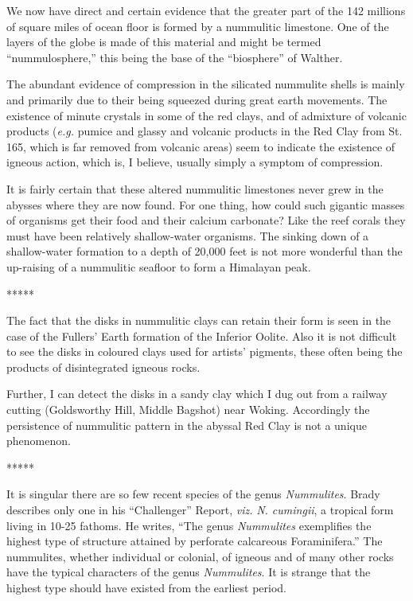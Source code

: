 \documentclass[a4paper, 12pt, oneside]{article}
\begin{document}
We now have direct and certain evidence that the greater part of the 142 millions of square miles of ocean floor is formed by a nummulitic limestone. One of the layers of the globe is made of this material and might be termed ``nummulosphere,'' this being the base of the ``biosphere'' of Walther.

The abundant evidence of compression in the silicated nummulite shells is mainly and primarily due to their being squeezed during great earth movements. The existence of minute crystals in some of the red clays, and of admixture of volcanic products (\emph{e.g.} pumice and glassy and volcanic products in the Red Clay from St. 165, which is far removed from volcanic areas) seem to indicate the existence of igneous action, which is, I believe, usually simply a symptom of compression.

It is fairly certain that these altered nummulitic limestones never grew in the abysses where they are now found. For one thing, how could such gigantic masses of organisms get their food and their calcium carbonate? Like the reef corals they must have been relatively shallow-water organisms. The sinking down of a shallow-water formation to a depth of 20,000 feet is not more wonderful than the up-raising of a nummulitic seafloor to form a Himalayan peak.

\centerline{*\hspace{15mm}*\hspace{15mm}*\hspace{15mm}*\hspace{15mm}*}
\bigskip

The fact that the disks in nummulitic clays can retain their form is seen in the case of the Fullers' Earth formation of the Inferior Oolite. Also it is not difficult to see the disks in coloured clays used for artists' pigments, these often being the products of disintegrated igneous rocks.

Further, I can detect the disks in a sandy clay which I dug out from a railway cutting (Goldsworthy Hill, Middle Bagshot) near Woking. Accordingly the persistence of nummulitic pattern in the abyssal Red Clay is not a unique phenomenon.

\centerline{*\hspace{15mm}*\hspace{15mm}*\hspace{15mm}*\hspace{15mm}*}
\bigskip

It is singular there are so few recent species of the genus \emph{Nummulites}. Brady describes only one in his ``Challenger'' Report, \emph{viz.} \emph{N. cumingii}, a tropical form living in 10-25 fathoms. He writes, ``The genus \emph{Nummulites} exemplifies the highest type of structure attained by perforate calcareous Foraminifera.'' The nummulites, whether individual or colonial, of igneous and of many other rocks have the typical characters of the genus \emph{Nummulites}. It is strange that the highest type should have existed from the earliest period.
\end{document}
